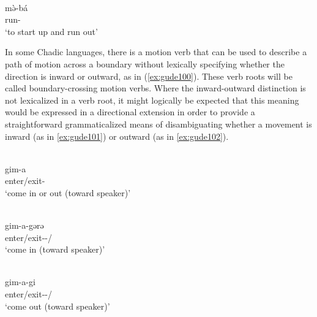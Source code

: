 \ea\label{ex:marg6}
 \\
\gll mə̀-bá	\\
run-		\\
\glt `to start up and run out'
\z 

In some Chadic languages, there is a motion verb that can be used to describe a path of motion across a boundary without lexically specifying whether the direction is inward or outward, as in (\ref{ex:gude100}). These verb roots will be called boundary-crossing motion verbs. Where the inward-outward distinction is not lexicalized in a verb root, it might logically be expected that this meaning would be expressed in a directional extension in order to provide a straightforward grammaticalized means of disambiguating whether a movement is inward (as in \ref{ex:gude101}) or outward (as in \ref{ex:gude102}). 

\ea\label{ex:gude1}
\ea\label{ex:gude100}
 \\
\gll gim-a	\\
enter/exit-		\\
\glt `come in or out (toward speaker)'

\ex\label{ex:gude101}
 \\
\gll gim-a-gərə	\\
enter/exit--/		\\
\glt `come in (toward speaker)'

\ex\label{ex:gude102}
 \\
\gll gim-a-gi	\\
enter/exit--/		\\
\glt `come out (toward speaker)'
\z 
\z 

